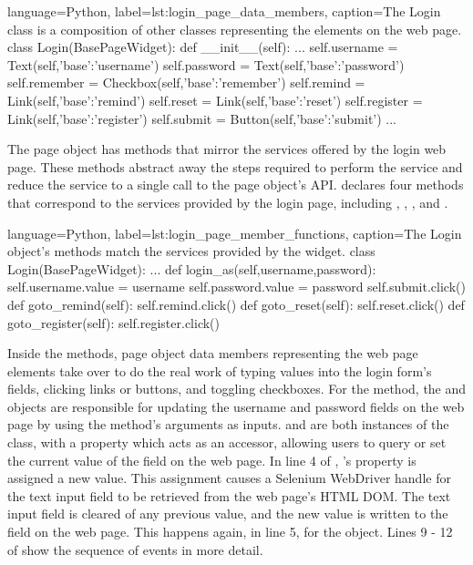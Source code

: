 \begin{xcode}{%
  language=Python,%
  label=lst:login_page_data_members,%
  caption={The Login class is a composition of other classes representing the %
           elements on the web page.}%
}
class Login(BasePageWidget):
    def __init__(self):
        ...
        self.username  = Text(self,{'base':'username'})
        self.password  = Text(self,{'base':'password'})
        self.remember  = Checkbox(self,{'base':'remember'})
        self.remind    = Link(self,{'base':'remind'})
        self.reset     = Link(self,{'base':'reset'})
        self.register  = Link(self,{'base':'register'})
        self.submit    = Button(self,{'base':'submit'})
        ...
\end{xcode}

The  page object has methods that mirror the services offered by
the login web page. These methods abstract away the steps required to perform
the service and reduce the service to a single call to the page object's API.
 declares four methods that
correspond to the services provided by the login page, including
, , ,
and .

\begin{xcode}{%
  language=Python,%
  label=lst:login_page_member_functions,%
  caption={The Login object's methods match the services provided by  %
            the widget.}%
}
class Login(BasePageWidget):
    ...
    def login_as(self,username,password):
        self.username.value = username
        self.password.value = password
        self.submit.click()
    def goto_remind(self):
        self.remind.click()
    def goto_reset(self):
        self.reset.click()
    def goto_register(self):
        self.register.click()
\end{xcode}


Inside the methods, page object data members representing the web page elements
take over to do the real work of typing values into the login form's fields,
clicking links or buttons, and toggling checkboxes. For the
 method, the  and
 objects are responsible for updating the username
and password fields on the web page by using the method's arguments as inputs.
 and  are both instances
of the  class, with a  property which acts as
an accessor, allowing users to query or set the current value of the field on
the web page. In line 4 of ,
's  property is assigned a new
value. This assignment causes a Selenium WebDriver handle for the text input
field to be retrieved from the web page's HTML DOM.  The text input field is
cleared of any previous value, and the new value is written to the field on the
web page. This happens again, in line 5, for the 
object. Lines 9 - 12 of  show the
sequence of events in more detail.

